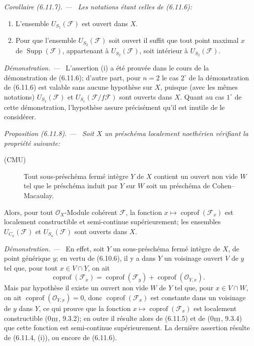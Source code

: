 \documentclass[10pt,oneside]{book}
\newcommand{\oldpage}[2][]{%
  \setcounter{footnote}{0}%
  \marginpar{\scriptsize\textbf{#1}~|~#2}\ignorespaces}
\newenvironment{proposition}[1][]{%
  \par\medskip\noindent\itshape Proposition (#1). ---\ }{\par}
\newenvironment{corollary}[1][]{%
  \par\medskip\noindent\itshape Corollaire (#1). ---\ }{\par}
\newenvironment{proof}{%
  \par\medskip\noindent\textit{Démonstration. ---\ }}{\par}
\begin{document}
\begin{corollary}[6.11.7]
\label{IV.2.s6.11.7-fr}
Les notations étant celles de (6.11.6):
\begin{enumerate}
\item[(i)] L'ensemble $U_{S_1}(\mathcal F)$ est ouvert dans $X$.
\item[(ii)] Pour que l'ensemble $U_{S_2}(\mathcal F)$ soit ouvert il suffit
que tout point maximal $x$ de $\operatorname{Supp}(\mathcal F)$,
appartenant à $U_{S_2}(\mathcal F)$, soit intérieur à
$U_{S_2}(\mathcal F)$.
\end{enumerate}
\end{corollary}

\begin{proof}
L'assertion (i) a été prouvée dans le cours de la démonstration de (6.11.6);
d'autre part, pour $n=2$ le cas $2^\circ$ de la démonstration de (6.11.6)
est valable sans aucune hypothèse sur $X$, puisque (avec les mêmes
notations) $U_{S_1}(\mathcal F)$ et
$U_{S_1}(\mathcal F/f\mathcal F)$ sont ouverts dans $X$. Quant au cas
$1^\circ$ de cette démonstration, l'hypothèse assure précisément qu'il est
inutile de le considérer.
\end{proof}

\oldpage[IV-2]{162}

\begin{proposition}[6.11.8]
\label{IV.2.s6.11.8-fr}
Soit $X$ un préschéma localement noethérien vérifiant la propriété suivante:
\begin{description}
\item[(CMU)] Tout sous-préschéma fermé intègre $Y$ de $X$ contient un ouvert
non vide $W$ tel que le préschéma induit par $Y$ sur $W$ soit un préschéma
de Cohen--Macaulay.
\end{description}
Alors, pour tout $\mathcal O_X$-Module cohérent $\mathcal F$, la fonction
$x\mapsto\operatorname{coprof}(\mathcal F_x)$ est localement constructible
et semi-continue supérieurement; les ensembles $U_{C_n}(\mathcal F)$ et
$U_{S_n}(\mathcal F)$ sont ouverts dans $X$.
\end{proposition}

\begin{proof}
En effet, soit $Y$ un sous-préschéma fermé intègre de $X$, de point
générique $y$; en vertu de (6.10.6), il y a dans $Y$ un voisinage ouvert
$V$ de $y$ tel que, pour tout $x\in V\cap Y$, on ait
\begin{equation}
\operatorname{coprof}(\mathcal F_x)=
\operatorname{coprof}(\mathcal F_y)+
\operatorname{coprof}(\mathcal O_{Y,x}).
\tag{6.11.8.1}\label{IV.2.s6.11.8.1-fr}
\end{equation}
Mais par hypothèse il existe un ouvert non vide $W$ de $Y$ tel que, pour
$x\in V\cap W$, on ait $\operatorname{coprof}(\mathcal O_{Y,x})=0$, donc
$\operatorname{coprof}(\mathcal F_x)$ est constante dans un voisinage de
$y$ dans $Y$, ce qui prouve que la fonction
$x\mapsto\operatorname{coprof}(\mathcal F_x)$ est localement constructible
(0$_{\rm III}$, 9.3.2); en outre il résulte alors de (6.11.5) et de
(0$_{\rm III}$, 9.3.4) que cette fonction est semi-continue supérieurement.
La dernière assertion résulte de (6.11.4, (i)), ou encore de (6.11.6).
\end{proof}
\end{document}
